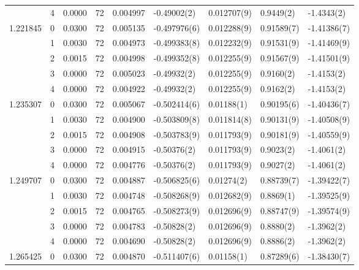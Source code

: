 \begin{tabular}{llrrrllll}
         & 4 &    0.0000 &     72 &  0.004997 &    -0.49002(2) &    0.012707(9) &      0.9449(2) &      -1.4343(2) \\
1.221845 & 0 &    0.0300 &     72 &  0.005135 &   -0.497976(6) &    0.012288(9) &     0.91589(7) &     -1.41386(7) \\
         & 1 &    0.0030 &     72 &  0.004973 &   -0.499383(8) &    0.012232(9) &     0.91531(9) &     -1.41469(9) \\
         & 2 &    0.0015 &     72 &  0.004998 &   -0.499352(8) &    0.012255(9) &     0.91567(9) &     -1.41501(9) \\
         & 3 &    0.0000 &     72 &  0.005023 &    -0.49932(2) &    0.012255(9) &      0.9160(2) &      -1.4153(2) \\
         & 4 &    0.0000 &     72 &  0.004922 &    -0.49932(2) &    0.012255(9) &      0.9162(2) &      -1.4153(2) \\
1.235307 & 0 &    0.0300 &     72 &  0.005067 &   -0.502414(6) &     0.01188(1) &     0.90195(6) &     -1.40436(7) \\
         & 1 &    0.0030 &     72 &  0.004900 &   -0.503809(8) &    0.011814(8) &     0.90131(9) &     -1.40508(9) \\
         & 2 &    0.0015 &     72 &  0.004908 &   -0.503783(9) &    0.011793(9) &     0.90181(9) &     -1.40559(9) \\
         & 3 &    0.0000 &     72 &  0.004915 &    -0.50376(2) &    0.011793(9) &      0.9023(2) &      -1.4061(2) \\
         & 4 &    0.0000 &     72 &  0.004776 &    -0.50376(2) &    0.011793(9) &      0.9027(2) &      -1.4061(2) \\
1.249707 & 0 &    0.0300 &     72 &  0.004887 &   -0.506825(6) &     0.01274(2) &     0.88739(7) &     -1.39422(7) \\
         & 1 &    0.0030 &     72 &  0.004748 &   -0.508268(9) &    0.012682(9) &      0.8869(1) &     -1.39525(9) \\
         & 2 &    0.0015 &     72 &  0.004765 &   -0.508273(9) &    0.012696(9) &     0.88747(9) &     -1.39574(9) \\
         & 3 &    0.0000 &     72 &  0.004783 &    -0.50828(2) &    0.012696(9) &      0.8880(2) &      -1.3962(2) \\
         & 4 &    0.0000 &     72 &  0.004690 &    -0.50828(2) &    0.012696(9) &      0.8886(2) &      -1.3962(2) \\
1.265425 & 0 &    0.0300 &     72 &  0.004870 &   -0.511407(6) &     0.01158(1) &     0.87289(6) &     -1.38430(7) \\

\end{tabular}
